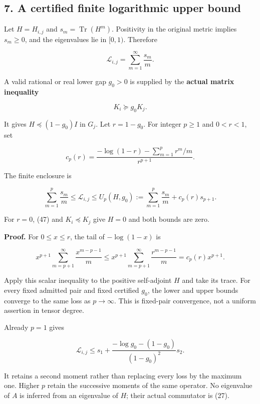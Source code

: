 \subsection{7. A certified finite logarithmic upper bound}\label{endpoint-restriction_original--a-certified-finite-logarithmic-upper-bound}

Let \(H=H_{i,j}\) and \(s_m=\operatorname{Tr}(H^m)\). Positivity in the original metric implies \(s_m\ge0\), and the eigenvalues lie in \([0,1)\). Therefore

\[
 \boxed{\mathcal L_{i,j}=\sum_{m=1}^{\infty}\frac{s_m}{m}.}       \tag{46}
\]

A valid rational or real lower gap \(g_0>0\) is supplied by the \textbf{actual matrix inequality}

\[
 \boxed{K_i\succeq g_0K_j.}                                      \tag{47}
\]

It gives \(H\preceq(1-g_0)I\) in \(G_j\). Let \(r=1-g_0\). For integer \(p\ge1\) and \(0<r<1\), set

\[
 c_p(r)=\frac{-\log(1-r)-\sum_{m=1}^pr^m/m}{r^{p+1}}.            \tag{48}
\]

The finite enclosure is

\[
 \boxed{
 \sum_{m=1}^p\frac{s_m}{m}
 \le\mathcal L_{i,j}
 \le U_p(H,g_0):=
 \sum_{m=1}^p\frac{s_m}{m}+c_p(r)s_{p+1}.}                        \tag{49}
\]

For \(r=0\), (47) and \(K_i\preceq K_j\) give \(H=0\) and both bounds are zero.

\textbf{Proof.} For \(0\le x\le r\), the tail of \(-\log(1-x)\) is

\[
 x^{p+1}\sum_{m=p+1}^\infty\frac{x^{m-p-1}}m
 \le x^{p+1}\sum_{m=p+1}^\infty\frac{r^{m-p-1}}m
 =c_p(r)x^{p+1}.
\]

Apply this scalar inequality to the positive self-adjoint \(H\) and take its trace. For every fixed admitted pair and fixed certified \(g_0\), the lower and upper bounds converge to the same loss as \(p\to\infty\). This is fixed-pair convergence, not a uniform assertion in tensor degree.

Already \(p=1\) gives

\[
 \mathcal L_{i,j}\le s_1+
 \frac{-\log g_0-(1-g_0)}{(1-g_0)^2}s_2.                          \tag{50}
\]

It retains a second moment rather than replacing every loss by the maximum one. Higher \(p\) retain the successive moments of the same operator. No eigenvalue of \(A\) is inferred from an eigenvalue of \(H\); their actual commutator is (27).

